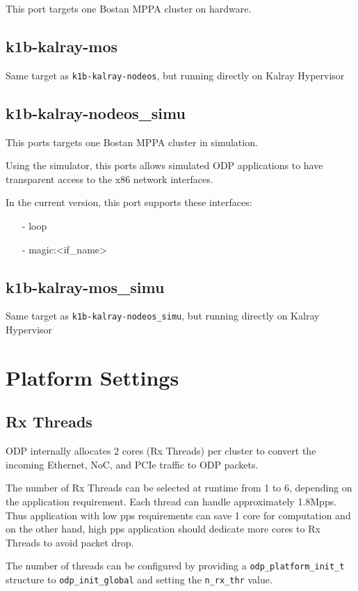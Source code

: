 \documentclass{trkalray}
\begin{document}
This port targets one Bostan MPPA cluster on hardware.

\subsection{k1b-kalray-mos}

Same target as \texttt{k1b-kalray-nodeos}, but running directly on
Kalray Hypervisor

\subsection{k1b-kalray-nodeos\_simu}

This ports targets one Bostan MPPA cluster in simulation.

Using the simulator, this ports allows simulated ODP applications to
have transparent access to the x86 network interfaces.

In the current version, this port supports these interfaces:
\begin{itemize}
\item[-]{loop}
\item[-]{magic:<if\_name>}
\end{itemize}
\subsection{k1b-kalray-mos\_simu}

Same target as \texttt{k1b-kalray-nodeos\_simu}, but running directly on
Kalray Hypervisor

\section{Platform Settings}
\subsection{Rx Threads}
ODP internally allocates 2 cores (Rx Threads) per cluster to convert the incoming
Ethernet, NoC, and PCIe traffic to ODP packets.

The number of Rx Threads can be selected at runtime from 1 to 6,
depending on the application requirement. Each thread can handle
approximately 1.8Mpps. Thus application with low pps requirements can
save 1 core for computation and on the other hand, high pps
application should dedicate more cores to Rx Threads to avoid packet
drop.

The number of threads can be configured by providing a
\texttt{odp\_platform\_init\_t} structure to
\texttt{odp\_init\_global} and setting the \texttt{n\_rx\_thr} value.
\end{document}
